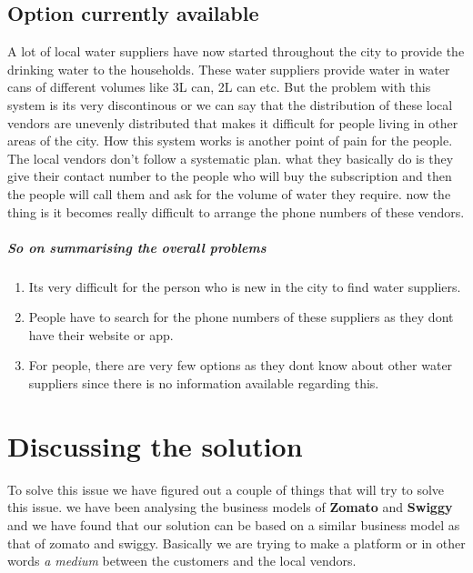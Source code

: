 \documentclass[a4paper, 12pt]{article}
\begin{document}
\subsection[short]{Option currently available}
A lot of local water suppliers have now started throughout the city to provide the drinking water to the households. These water suppliers provide water in water cans 
of different volumes like 3L can, 2L can etc. But the problem with this system is its very discontinous or we can say that the distribution of these local vendors are
unevenly distributed that makes it difficult for people living in other areas of the city. How this system works is another point of pain for the people. The local vendors
don't follow a systematic plan. what they basically do is they give their contact number to the people who will buy the subscription and then the people will call them and
ask for the volume of water they require. now the thing is it becomes really difficult to arrange the phone numbers of these vendors. 
\subparagraph*{So on summarising the overall problems}

\begin{enumerate}
    \item Its very difficult for the person who is new in the city to find water suppliers.
    \item People have to search for the phone numbers of these suppliers as they dont have their website or app.
    \item For people, there are very few options as they dont know about other water suppliers since there is no information available regarding this.
\end{enumerate}

\section*{Discussing the solution}
To solve this issue we have figured out a couple of things that will try to solve this issue. we have been analysing the business
models of \textbf{Zomato} and \textbf{Swiggy} and we have found that our solution can be based on a similar business model as that 
of zomato and swiggy. Basically we are trying to make a platform or in other words \textit{a medium} between the customers and the 
local vendors.
\end{document}

